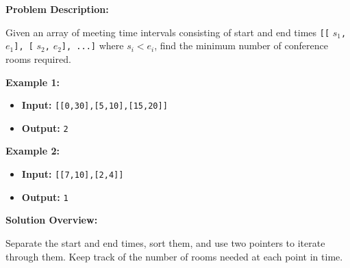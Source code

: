 

\textbf{Problem Description:}

Given an array of meeting time intervals consisting of start and end times \texttt{[[} \(s_1\)\texttt{,} \(e_1\)\texttt{], [} \(s_2\)\texttt{,} \(e_2\)\texttt{], ...]} where \(s_i < e_i\), find the minimum number of conference rooms required.

\textbf{Example 1:}

\begin{itemize}
    \item \textbf{Input:} \texttt{[[0,30],[5,10],[15,20]]}
    \item \textbf{Output:} \texttt{2}
\end{itemize}

\textbf{Example 2:}

\begin{itemize}
    \item \textbf{Input:} \texttt{[[7,10],[2,4]]}
    \item \textbf{Output:} \texttt{1}
\end{itemize}

\textbf{Solution Overview:}

Separate the start and end times, sort them, and use two pointers to iterate through them. Keep track of the number of rooms needed at each point in time.


